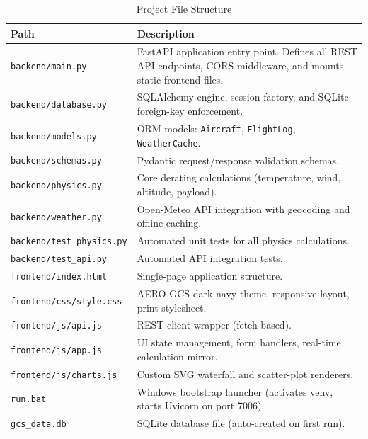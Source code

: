 \documentclass[11pt,a4paper]{article}
\begin{document}
\begin{table}[H]
    \centering
    \begin{tabularx}{\textwidth}{@{}lX@{}}
        \toprule
        \textbf{Path} & \textbf{Description} \\
        \midrule
        \texttt{backend/main.py} & FastAPI application entry point. Defines all REST API endpoints, CORS middleware, and mounts static frontend files. \\
        \texttt{backend/database.py} & SQLAlchemy engine, session factory, and SQLite foreign-key enforcement. \\
        \texttt{backend/models.py} & ORM models: \texttt{Aircraft}, \texttt{FlightLog}, \texttt{WeatherCache}. \\
        \texttt{backend/schemas.py} & Pydantic request/response validation schemas. \\
        \texttt{backend/physics.py} & Core derating calculations (temperature, wind, altitude, payload). \\
        \texttt{backend/weather.py} & Open-Meteo API integration with geocoding and offline caching. \\
        \texttt{backend/test\_physics.py} & Automated unit tests for all physics calculations. \\
        \texttt{backend/test\_api.py} & Automated API integration tests. \\
        \midrule
        \texttt{frontend/index.html} & Single-page application structure. \\
        \texttt{frontend/css/style.css} & AERO-GCS dark navy theme, responsive layout, print stylesheet. \\
        \texttt{frontend/js/api.js} & REST client wrapper (fetch-based). \\
        \texttt{frontend/js/app.js} & UI state management, form handlers, real-time calculation mirror. \\
        \texttt{frontend/js/charts.js} & Custom SVG waterfall and scatter-plot renderers. \\
        \midrule
        \texttt{run.bat} & Windows bootstrap launcher (activates venv, starts Uvicorn on port 7006). \\
        \texttt{gcs\_data.db} & SQLite database file (auto-created on first run). \\
        \bottomrule
    \end{tabularx}
    \caption{Project File Structure}
\end{table}
\end{document}
